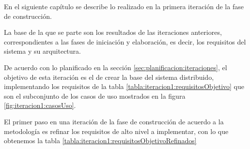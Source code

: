 
\label{chap:iteracion1}


En el siguiente capítulo se describe lo realizado en la primera iteración de la fase de construcción.
\newline


La base de la que se parte son los resultados de las iteraciones anteriores, correspondientes a las fases de iniciación y elaboración, es decir, los requisitos del sistema y su arquitectura.
\newline

De acuerdo con lo planificado en la sección \ref{sec:planificacion:iteraciones}, el objetivo de esta iteración es el de crear la base del sistema distribuido, implementando los requisitos de la tabla \ref{tabla:iteracion1:requisitosObjetivo} que son el subconjunto de los casos de uso mostrados en la figura \ref{fig:iteracion1:casosUso}.
\newline

El primer paso en una iteración de la fase de construcción de acuerdo a la metodología es refinar los requisitos de alto nivel a implementar, con lo que obtenemos la tabla \ref{tabla:iteracion1:requisitosObjetivoRefinados}
\newline


\chaptertoc


